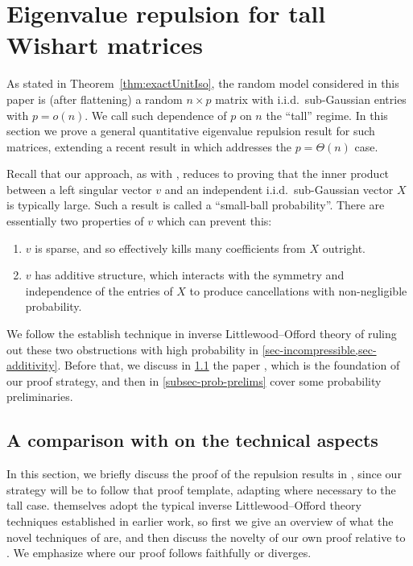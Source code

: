 \documentclass[11pt]{article}
\numberwithin{equation}{section}
\theoremstyle{remark}
\begin{document}
\newpage

\section{Eigenvalue repulsion for tall Wishart matrices}\label{sec-repulsion}
As stated in Theorem~\ref{thm:exactUnitIso}, the random model considered in this paper is (after flattening) a random $n \times p$ matrix with i.i.d.\ sub-Gaussian entries with $p = o(n)$. We call such dependence of $p$ on $n$ the ``tall'' regime. In this section we prove a general quantitative eigenvalue repulsion result for such matrices, extending a recent result in \cite{christoffersen2025gaps} which addresses the $p = \Theta(n)$ case.

Recall that our approach, as with \cite{nguyen2015randommatricestailbounds,christoffersen2025gaps}, reduces to proving that the inner product between a left singular vector $v$ and an independent i.i.d.\ sub-Gaussian vector $X$ is typically large. Such a result is called a ``small-ball probability''. There are essentially two properties of $v$ which can prevent this: \begin{enumerate}
    \item $v$ is sparse, and so effectively kills many coefficients from $X$ outright.
    \item $v$ has additive structure, which interacts with the symmetry and independence of the entries of $X$ to produce cancellations with non-negligible probability.
\end{enumerate}

We follow the establish technique in inverse Littlewood--Offord theory of ruling out these two obstructions with high probability in \cref{sec-incompressible,sec-additivity}. Before that, we discuss in \cref{sec-clos-proof-structure} the paper \cite{christoffersen2025gaps}, which is the foundation of our proof strategy, and then in \cref{subsec-prob-prelims} cover some probability preliminaries.

\subsection{A comparison with \cite{christoffersen2025gaps} on the technical aspects}\label{sec-clos-proof-structure}
In this section, we briefly discuss the proof of the repulsion results in \cite{christoffersen2025gaps}, since our strategy will be to follow that proof template, adapting where necessary to the tall case. \cite{christoffersen2025gaps} themselves adopt the typical inverse Littlewood--Offord theory techniques established in earlier work, so first we give an overview of what the novel techniques of \cite{christoffersen2025gaps} are, and then discuss the novelty of our own proof relative to \cite{christoffersen2025gaps}. We emphasize where our proof follows \cite{christoffersen2025gaps} faithfully or diverges.
\end{document}
